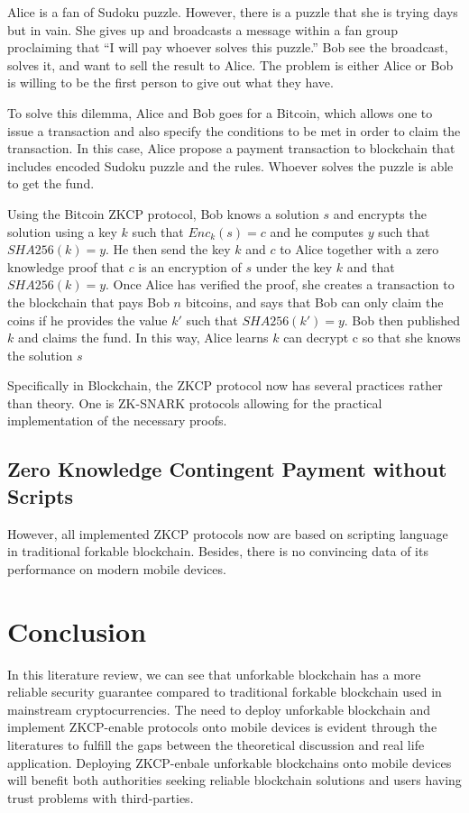 \documentclass[12pt]{article}
\begin{document}
\begin{displayquote}
    Alice is a fan of Sudoku puzzle. However, there is a puzzle that she is trying days but in vain. She gives up and broadcasts a message within a fan group proclaiming that ``I will pay whoever solves this puzzle.'' Bob see the broadcast, solves it, and want to sell the result to Alice. The problem is either Alice or Bob is willing to be the first person to give out what they have.

    To solve this dilemma, Alice and Bob goes for a Bitcoin, which allows one to issue a transaction and also specify the conditions to be met in order to claim the transaction. In this case, Alice propose a payment transaction to blockchain that includes encoded Sudoku puzzle and the rules. Whoever solves the puzzle is able to get the fund.

    Using the Bitcoin ZKCP protocol, Bob knows a solution $s$ and encrypts the solution using a key $k$ such that $Enc_k(s)=c$ and he computes $y$ such that $SHA256(k)=y$. He then send the key $k$ and $c$ to Alice together with a zero knowledge proof that $c$ is an encryption of $s$ under the key $k$ and  that $SHA256(k)=y$. Once Alice has verified the proof, she creates a transaction to the blockchain that pays Bob $n$ bitcoins, and says that Bob can only claim the coins if he provides the value $k'$ such that $SHA256(k')=y$. Bob then published $k$ and claims the fund. In this way, Alice learns $k$ can decrypt c so that she knows the solution $s$
\end{displayquote}

Specifically in Blockchain, the ZKCP protocol now has several practices rather than theory. One is ZK-SNARK protocols allowing for the practical implementation of the necessary proofs\cite{kalai2006succinct}\cite{ben2015secure}\cite{ecc2011}.

\subsection{Zero Knowledge Contingent Payment without Scripts}

However, all implemented ZKCP protocols now are based on scripting language in traditional forkable blockchain\cite{Banasik2016}. Besides, there is no convincing data of its performance on modern mobile devices\cite{doi:10.1080/00207160.2014.933816}.

\section{Conclusion}

In this literature review, we can see that unforkable blockchain has a more reliable security guarantee compared to traditional forkable blockchain used in mainstream cryptocurrencies. The need to deploy unforkable blockchain and implement ZKCP-enable protocols onto mobile devices is evident through the literatures to fulfill the gaps between the theoretical discussion and real life application. Deploying ZKCP-enbale unforkable blockchains onto mobile devices will benefit both authorities seeking reliable blockchain solutions and users having trust problems with third-parties.

\newpage


\end{document}
